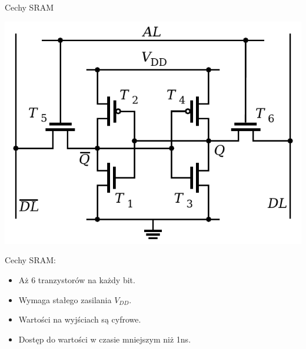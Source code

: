\documentclass{beamer}
\begin{document}
\begin{frame}{Cechy SRAM}
	  \begin{minipage}{0.6\textwidth}
    \includegraphics[scale=0.6]{assets/SRAM_bit.pdf}
  \end{minipage}%
  \begin{minipage}{0.4\textwidth}
  Cechy SRAM:
  	\begin{itemize}
		\pause
		\item Aż 6 tranzystorów na każdy bit.
		\pause
		\item Wymaga stałego zasilania $V_{DD}.$
		\pause
		\item Wartości na wyjściach są cyfrowe.
		\pause
		\item Dostęp do wartości w czasie mniejszym niż 1ns.
  	\end{itemize}
  \end{minipage}
\end{frame}
\end{document}
